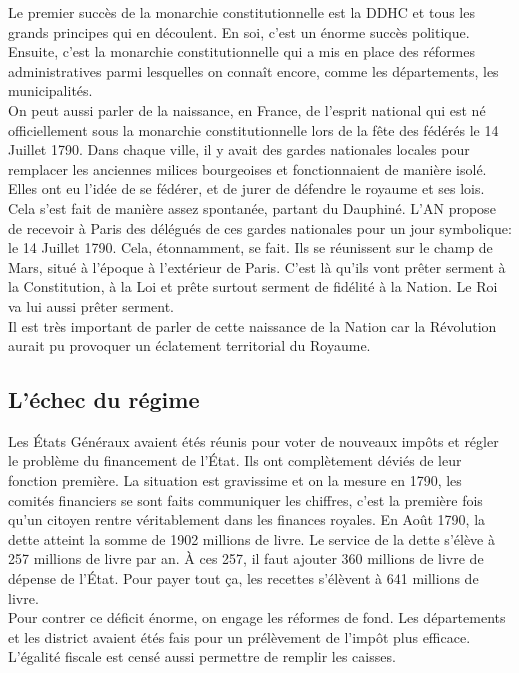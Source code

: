 \documentclass[10pt, a4paper, openany]{book}
\begin{document}
Le premier succès de la monarchie constitutionnelle est la DDHC et tous les grands principes qui en découlent. En soi, c'est un énorme succès politique. \\
Ensuite, c'est la monarchie constitutionnelle qui a mis en place des réformes administratives parmi lesquelles on connaît encore, comme les départements, les municipalités. \\
On peut aussi parler de la naissance, en France, de l'esprit national qui est né officiellement sous la monarchie constitutionnelle lors de la fête des fédérés le 14 Juillet 1790. Dans chaque ville, il y avait des gardes nationales locales pour remplacer les anciennes milices bourgeoises et fonctionnaient de manière isolé. Elles ont eu l'idée de se fédérer, et de jurer de défendre le royaume et ses lois. Cela s'est fait de manière assez spontanée, partant du Dauphiné. L'AN propose de recevoir à Paris des délégués de ces gardes nationales pour un jour symbolique: le 14 Juillet 1790. Cela, étonnamment, se fait. Ils se réunissent sur le champ de Mars, situé à l'époque à l'extérieur de Paris. C'est là qu'ils vont prêter serment à la Constitution, à la Loi et prête surtout serment de fidélité à la Nation. Le Roi va lui aussi prêter serment. \\
Il est très important de parler de cette naissance de la Nation car la Révolution aurait pu provoquer un éclatement territorial du Royaume. 

\subsection{L'échec du régime}

Les États Généraux avaient étés réunis pour voter de nouveaux impôts et régler le problème du financement de l'État. Ils ont complètement déviés de leur fonction première. La situation est gravissime et on la mesure en 1790, les comités financiers se sont faits communiquer les chiffres, c'est la première fois qu'un citoyen rentre véritablement dans les finances royales. En Août 1790, la dette atteint la somme de 1902 millions de livre. Le service de la dette s'élève à 257 millions de livre par an. À ces 257, il faut ajouter 360 millions de livre de dépense de l'État. Pour payer tout ça, les recettes s'élèvent à 641 millions de livre. \\
Pour contrer ce déficit énorme, on engage les réformes de fond. Les départements et les district avaient étés fais pour un prélèvement de l'impôt plus efficace. L'égalité fiscale est censé aussi permettre de remplir les caisses. \\
\end{document}
